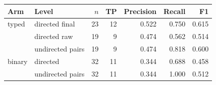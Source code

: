 \begin{tabular}{llrrrrr}
  \toprule
  Arm & Level & $n$ & TP & Precision & Recall & F1 \\
  \midrule
  typed  & directed final    & 23 & 12 & 0.522 & 0.750 & 0.615 \\
         & directed raw      & 19 & 9 & 0.474 & 0.562 & 0.514 \\
         & undirected pairs  & 19 & 9 & 0.474 & 0.818 & 0.600 \\
  \midrule
  binary & directed          & 32 & 11 & 0.344 & 0.688 & 0.458 \\
         & undirected pairs  & 32 & 11 & 0.344 & 1.000 & 0.512 \\
  \bottomrule
\end{tabular}
